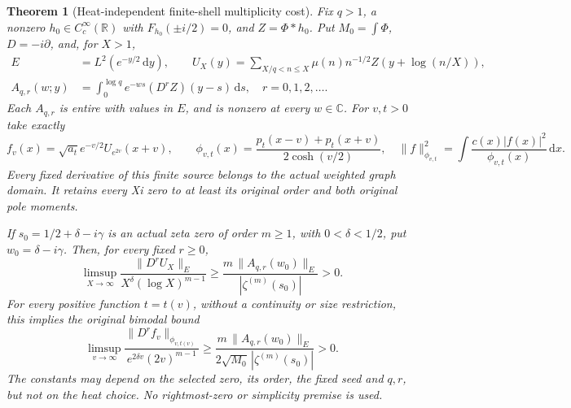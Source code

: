 \documentclass[11pt]{article}
\newtheorem{theorem}{Theorem}
\theoremstyle{remark}\newtheorem{remark}[theorem]{Remark}
\newcommand{\R}{\mathbb R}
\newcommand{\C}{\mathbb C}
\newcommand{\dd}{\,\mathrm d}
\begin{document}
\begin{theorem}[Heat-independent finite-shell multiplicity cost]
\label{thm:bimodal-multiplicity-flux}
Fix \(q>1\), a nonzero \(h_0\in C_c^\infty(\R)\) with
\(F_{h_0}(\pm i/2)=0\), and \(Z=\Phi*h_0\).
Put \(M_0=\int\Phi\), \(D=-i\partial\), and, for \(X>1\),
\[
 \begin{split}
 E&=L^2(e^{-y/2}\dd y),\qquad
 U_X(y)=\sum_{X/q<n\le X}\mu(n)n^{-1/2}
                         Z(y+\log(n/X)),\\
 A_{q,r}(w;y)&=\int_0^{\log q}e^{-ws}(D^rZ)(y-s)\dd s,
                   \quad r=0,1,2,\ldots .
 \end{split}                                                   \tag{BMF1}
\]
Each \(A_{q,r}\) is entire with values in \(E\), and is nonzero
at every \(w\in\C\). For \(v,t>0\) take exactly
\[
 f_v(x)=\sqrt{a_t}e^{-v/2}U_{e^{2v}}(x+v),\qquad
 \phi_{v,t}(x)=\frac{p_t(x-v)+p_t(x+v)}{2\cosh(v/2)},\quad
 \|f\|_{\phi_{v,t}}^2=\int\frac{c(x)|f(x)|^2}{\phi_{v,t}(x)}\dd x.
                                                               \tag{BMF2}
\]
Every fixed derivative of this finite source belongs to the
actual weighted graph domain. It retains every Xi zero to
at least its original order and both original pole moments.

If \(s_0=1/2+\delta-i\gamma\) is an actual zeta zero of
order \(m\ge1\), with \(0<\delta<1/2\), put
\(w_0=\delta-i\gamma\). Then, for every fixed \(r\ge0\),
\[
 \limsup_{X\to\infty}
 \frac{\|D^rU_X\|_E}{X^\delta(\log X)^{m-1}}
 \ge\frac{m\,\|A_{q,r}(w_0)\|_E}{|\zeta^{(m)}(s_0)|}>0 .       \tag{BMF3}
\]
For every positive function \(t=t(v)\), without a continuity
or size restriction, this implies the original bimodal bound
\[
 \limsup_{v\to\infty}
 \frac{\|D^rf_v\|_{\phi_{v,t(v)}}}
      {e^{2\delta v}(2v)^{m-1}}
 \ge\frac{m\,\|A_{q,r}(w_0)\|_E}
             {2\sqrt{M_0}\,|\zeta^{(m)}(s_0)|}>0 .              \tag{BMF4}
\]
The constants may depend on the selected zero, its order,
the fixed seed and \(q,r\), but not on the heat choice.
No rightmost-zero or simplicity premise is used.
\end{theorem}
\end{document}

